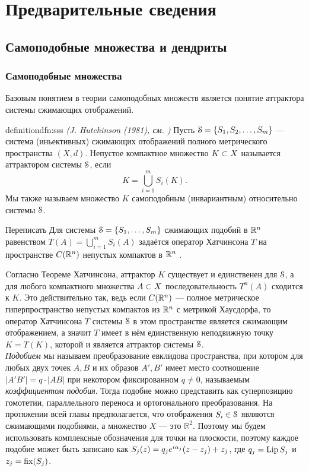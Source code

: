 \chapter{Предварительные сведения}

\section{Самоподобные множества и дендриты}

\subsection{Самоподобные множества}

Базовым понятием в теории самоподобных множеств является понятие аттрактора системы сжимающих отображений.

\begin{restatethis}{definition}{dfn:sss}%
{\em (J. Hutchinson (1981), см. {\cite{Hut1981}})} 
Пусть ${\EuScript S}=\{S_1, S_2, \ldots, S_m\}$ ---  система (иньективных) сжимающих отображений полного метрического пространства $(X, d)$.
Непустое компактное множество $K\subset X$ называется аттрактором системы ${\EuScript S}$, если 
$$K = \bigcup \limits_{i=1}^m S_i (K).$$
Мы также называем множество $K$ самоподобным (инвариантным) относительно системы ${\EuScript S}$.
\end{restatethis} 
\begin{definition} Переписать
Для системы ${\EuScript S}=\{S_1,\ldots,S_m\}$ сжимающих подобий в $\mathbb{R}^n$  равенством $T(A)=\bigcup\limits_{i=1}^m S_i(A)$ задаётся  оператор Хатчинсона $T$ на пространстве $C(\mathbb{R}^n)$ непустых компактов в $\mathbb{R}^n$ .
\end{definition}

Cогласно Теореме Хатчинсона, аттрактор $K$ существует и единственен для ${\EuScript S}$, а для любого компактного множества $A\subset X$ последовательность $T^n (A)$ сходится к $K$.
Это действительно так, ведь если $C(\mathbb{R}^n)$ --- полное метрическое гиперпространство непустых компактов из $\mathbb{R}^n$ с метрикой Хаусдорфа, то оператор Хатчинсона $T$ системы ${\EuScript S}$ в этом пространстве является сжимающим отображением, а значит $T$ имеет в нём единственную неподвижную точку $K=T(K)$, которой и является аттрактор системы ${\EuScript S}$.\\

{\em Подобием} мы называем преобразование евклидова пространства, при котором для любых двух точек $A, B$ и их образов $A',B'$ имеет место соотношение $|A'B'|=q\cdot |AB|$ при некотором фиксированном $q\neq 0$, называемым {\em коэффициентом подобия}.
Тогда подобие можно представить как суперпозицию гомотетии, параллельного переноса и ортогонального преобразования.
На протяжении всей главы предполагается, что отображения $S_i\in {\EuScript S}$ являются сжимающими подобиями, а множество $X$ --- это $\mathbb{R}^2$.
Поэтому мы будем использовать комплексные обозначения для точки на плоскости, поэтому каждое подобие может быть записано как $S_j(z)=q_j e^{i\alpha_j}(z-z_j)+z_j$, где $q_j=\mathop{\rm Lip} \nolimits S_j$ и $z_j=\mathop{\rm fix} \nolimits(S_j)$.

